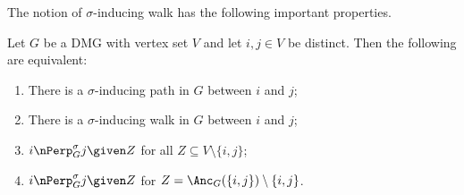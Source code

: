 The notion of $\sigma$-inducing walk has the following important properties.
\begin{Prp}\label{prp:sigma-inducing_path_properties}
  Let $G$ be a DMG with vertex set $V$ and let $i,j \in V$ be distinct. Then the following are equivalent:
  \begin{enumerate}[label=(\roman*)]
    \item There is a $\sigma$-inducing path in $G$ between $i$ and $j$;
    \item There is a $\sigma$-inducing walk in $G$ between $i$ and $j$;
    \item $i \nPerp^\sigma_G j \given Z$ for all $Z \subseteq V \setminus \{i,j\}$;
    \item $i \nPerp^\sigma_G j \given Z$ for $Z = \Anc_G(\{i,j\}) \setminus \{i,j\}$.
  \end{enumerate}
\end{Prp}
